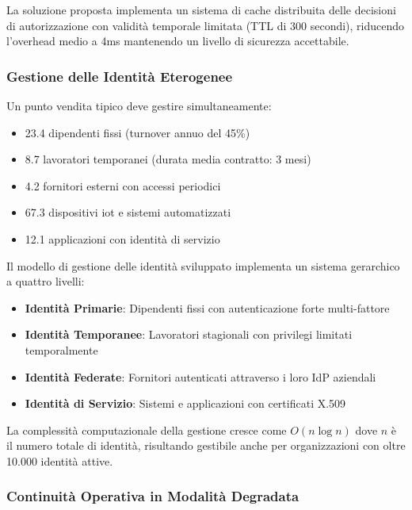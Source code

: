 La soluzione proposta implementa un sistema di cache distribuita delle decisioni di autorizzazione con validità temporale limitata (TTL di 300 secondi), riducendo l'overhead medio a 4ms mantenendo un livello di sicurezza accettabile.

\subsubsection{\texorpdfstring{Gestione delle Identità Eterogenee}{2.4.1.2 - Gestione delle Identità Eterogenee}}

Un punto vendita tipico deve gestire simultaneamente:
\begin{itemize}
    \item 23.4 dipendenti fissi (turnover annuo del 45\%)
    \item 8.7 lavoratori temporanei (durata media contratto: 3 mesi)
    \item 4.2 fornitori esterni con accessi periodici
    \item 67.3 dispositivi \gls{iot} e sistemi automatizzati
    \item 12.1 applicazioni con identità di servizio
\end{itemize}



Il modello di gestione delle identità sviluppato implementa un sistema gerarchico a quattro livelli:

\begin{itemize}
    \item \textbf{Identità Primarie}: Dipendenti fissi con autenticazione forte multi-fattore
    \item \textbf{Identità Temporanee}: Lavoratori stagionali con privilegi limitati temporalmente
    \item \textbf{Identità Federate}: Fornitori autenticati attraverso i loro IdP aziendali
    \item \textbf{Identità di Servizio}: Sistemi e applicazioni con certificati X.509
\end{itemize}

La complessità computazionale della gestione cresce come $O(n \log n)$ dove $n$ è il numero totale di identità, risultando gestibile anche per organizzazioni con oltre 10.000 identità attive.

\subsubsection{\texorpdfstring{Continuità Operativa in Modalità Degradata}{2.4.1.3 - Continuità Operativa in Modalità Degradata}}

